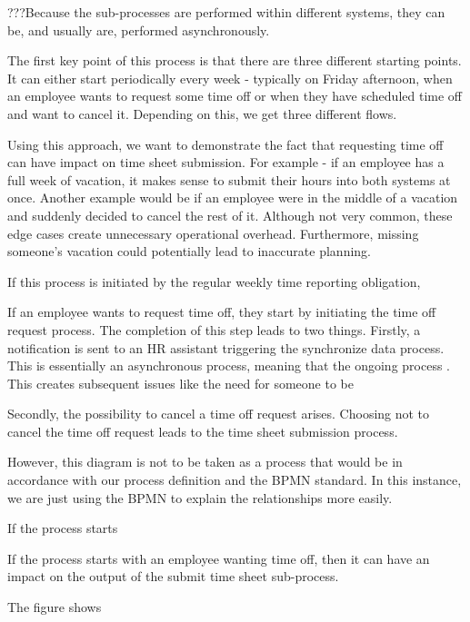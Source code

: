 \documentclass[12pt,oneside]{fithesis2}
\begin{document}
???Because the sub-processes are performed within different systems, they can be, and usually are, performed asynchronously.

The first key point of this process is that there are three different starting points. It can either start periodically every week - typically on Friday afternoon, when an employee wants to request some time off or when they have scheduled time off and want to cancel it. Depending on this, we get three different flows.

Using this approach, we want to demonstrate the fact that requesting time off can have impact on time sheet submission. For example - if an employee has a full week of vacation, it makes sense to submit their hours into both systems at once. Another example would be if an employee were in the middle of a vacation and suddenly decided to cancel the rest of it. Although not very common, these edge cases create unnecessary operational overhead. Furthermore, missing someone's vacation could potentially lead to inaccurate planning.

If this process is initiated by the regular weekly time reporting obligation, 

If an employee wants to request time off, they start by initiating the time off request process. The completion of this step leads to two things. Firstly, a notification is sent to an HR assistant triggering the synchronize data process.  This is essentially an asynchronous process, meaning that the ongoing process . This creates subsequent issues like the need for someone to be 

Secondly, the possibility to cancel a time off request arises. Choosing not to cancel the time off request leads to the time sheet submission process.

However, this diagram is not to be taken as a process that would be in accordance with our process definition and the BPMN standard. In this instance, we are just using the BPMN to explain the relationships more easily.


If the process starts 

If the process starts with an employee wanting time off, then it can have an impact on the output of the submit time sheet sub-process.

The figure shows 
\end{document}
